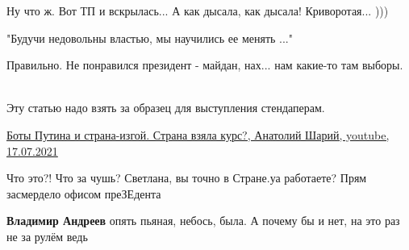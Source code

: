 \begin{itemize}
\obeycr
Ну что ж.
Вот ТП и вскрылась...
А как дысала, как дысала!
Криворотая...
)))
\restorecr

 

"Будучи недовольны властью, мы научились ее менять ..."

Правильно. Не понравился президент - майдан, нах... нам какие-то там выборы.
🤣🤣🤣

Эту статью надо взять за образец для выступления стендаперам. 🤣


 

\href{https://youtu.be/RlH_kf_lUS8}{%
Боты Путина и страна-изгой. Страна взяла курс?, Анатолий Шарий, youtube, 17.07.2021%
}


\par
 
Что это?! Что за чушь? Светлана, вы точно в Стране.уа работаете? Прям засмердело офисом преЗЕдента

\begin{itemize}
 
\textbf{Владимир Андреев} опять пьяная, небось, была. А почему бы и нет, на это раз не за рулём ведь 🤣🤣
\end{itemize}

\end{itemize}

